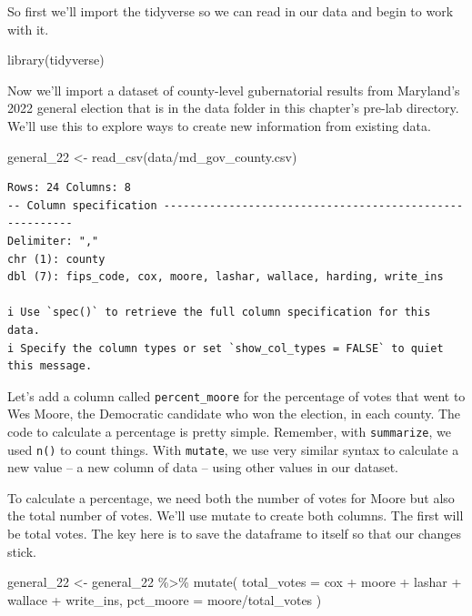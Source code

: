 \documentclass[
  letterpaper,
  DIV=11,
  numbers=noendperiod]{scrreprt}
\newenvironment{Shaded}{\begin{snugshade}}{\end{snugshade}}
\newcommand{\AttributeTok}[1]{\textcolor[rgb]{0.40,0.45,0.13}{#1}}
\newcommand{\FunctionTok}[1]{\textcolor[rgb]{0.28,0.35,0.67}{#1}}
\newcommand{\NormalTok}[1]{\textcolor[rgb]{0.00,0.23,0.31}{#1}}
\newcommand{\OtherTok}[1]{\textcolor[rgb]{0.00,0.23,0.31}{#1}}
\newcommand{\SpecialCharTok}[1]{\textcolor[rgb]{0.37,0.37,0.37}{#1}}
\newcommand{\StringTok}[1]{\textcolor[rgb]{0.13,0.47,0.30}{#1}}
\begin{document}
So first we'll import the tidyverse so we can read in our data and begin
to work with it.

\begin{Shaded}
\begin{Highlighting}[]
\FunctionTok{library}\NormalTok{(tidyverse)}
\end{Highlighting}
\end{Shaded}

Now we'll import a dataset of county-level gubernatorial results from
Maryland's 2022 general election that is in the data folder in this
chapter's pre-lab directory. We'll use this to explore ways to create
new information from existing data.

\begin{Shaded}
\begin{Highlighting}[]
\NormalTok{general\_22 }\OtherTok{\textless{}{-}} \FunctionTok{read\_csv}\NormalTok{(}\StringTok{\textquotesingle{}data/md\_gov\_county.csv\textquotesingle{}}\NormalTok{)}
\end{Highlighting}
\end{Shaded}

\begin{verbatim}
Rows: 24 Columns: 8
-- Column specification --------------------------------------------------------
Delimiter: ","
chr (1): county
dbl (7): fips_code, cox, moore, lashar, wallace, harding, write_ins

i Use `spec()` to retrieve the full column specification for this data.
i Specify the column types or set `show_col_types = FALSE` to quiet this message.
\end{verbatim}

Let's add a column called \texttt{percent\_moore} for the percentage of
votes that went to Wes Moore, the Democratic candidate who won the
election, in each county. The code to calculate a percentage is pretty
simple. Remember, with \texttt{summarize}, we used \texttt{n()} to count
things. With \texttt{mutate}, we use very similar syntax to calculate a
new value -- a new column of data -- using other values in our dataset.

To calculate a percentage, we need both the number of votes for Moore
but also the total number of votes. We'll use mutate to create both
columns. The first will be total votes. The key here is to save the
dataframe to itself so that our changes stick.

\begin{Shaded}
\begin{Highlighting}[]
\NormalTok{general\_22 }\OtherTok{\textless{}{-}}\NormalTok{ general\_22 }\SpecialCharTok{\%\textgreater{}\%}
  \FunctionTok{mutate}\NormalTok{(}
    \AttributeTok{total\_votes =}\NormalTok{ cox }\SpecialCharTok{+}\NormalTok{ moore }\SpecialCharTok{+}\NormalTok{ lashar }\SpecialCharTok{+}\NormalTok{ wallace }\SpecialCharTok{+}\NormalTok{ write\_ins,}
    \AttributeTok{pct\_moore =}\NormalTok{ moore}\SpecialCharTok{/}\NormalTok{total\_votes}
\NormalTok{  )}
\end{Highlighting}
\end{Shaded}
\end{document}
